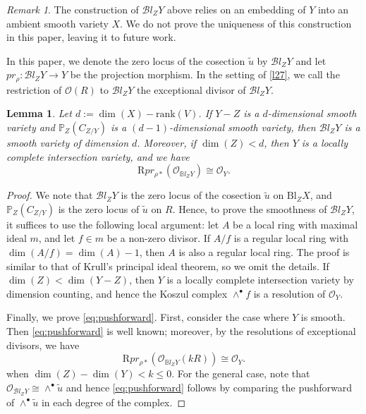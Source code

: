 \documentclass{amsart}
\numberwithin{equation}{section}
\newcommand\mc{\mathcal}
\newcommand\mb{\mathbb}
\newcommand{\rank}{\mathrm{rank}}
\newcommand{\Bl}{\mathrm{Bl}}
\newtheorem{lemma}[theorem]{Lemma}
\theoremstyle{definition}
\theoremstyle{remark}
\newtheorem{remark}[theorem]{Remark}
\begin{document}
\begin{remark}
  The construction of $\mc{B}l_ZY$ above relies on an embedding of $Y$ into an ambient smooth variety $X$. We do not prove the uniqueness of this construction in this paper, leaving it to future work. 
\end{remark}
In this paper, we denote the zero locus of the cosection $\tilde{u}$ by $\mc{B}l_ZY$ and let $pr_\rho:\mc{B}l_ZY\to Y$ be the projection morphism. In the setting of \cref{l27}, we call the restriction of $\mc{O}(R)$ to $\mc{B}l_ZY$ the exceptional divisor of $\mc{B}l_ZY$. 
\begin{lemma}
  \label{l28}
  Let $d:=\dim(X)-\rank(V)$. 
  If $Y-Z$ is a $d$-dimensional smooth variety and $\mb{P}_Z(C_{Z/Y})$ is a $(d-1)$-dimensional smooth variety, then $\mc{B}l_ZY$ is a smooth variety of dimension $d$. Moreover, if $\dim(Z)<d$, then $Y$ is a locally complete intersection variety, and we have 
  \begin{equation}
    \label{eq:pushforward}
    \mathrm{R}pr_{\rho*}(\mathcal{O}_{\mb{B}l_ZY})\cong \mathcal{O}_Y.
  \end{equation}
\end{lemma}
\begin{proof}
  We note that $\mc{B}l_ZY$ is the zero locus of the cosection $\tilde{u}$ on $\Bl_ZX$, and $\mb{P}_Z(C_{Z/Y})$ is the zero locus of $\tilde{u}$ on $R$. Hence, to prove the smoothness of $\mc{B}l_ZY$, it suffices to use the following local argument: let $A$ be a local ring with maximal ideal $m$, and let $f\in m$ be a non-zero divisor. If $A/f$ is a regular local ring with $\dim(A/f)=\dim(A)-1$, then $A$ is also a regular local ring. The proof is similar to that of Krull's principal ideal theorem, so we omit the details. If $\dim(Z)< \dim(Y-Z)$, then $Y$ is a locally complete intersection variety by dimension counting, and hence the Koszul complex $\wedge^{\bullet}f$ is a resolution of $\mathcal{O}_Y$. 

  Finally, we prove \cref{eq:pushforward}. First, consider the case where $Y$ is smooth. Then \cref{eq:pushforward} is well known; moreover, by the resolutions of exceptional divisors, we have 
    \begin{equation*}
    \mathrm{R}pr_{\rho*}(\mathcal{O}_{\mb{B}l_ZY}(kR))\cong \mathcal{O}_Y.
  \end{equation*}
  when $\dim(Z)-\dim(Y)< k\leq 0$. For the general case, note that $\mc{O}_{\mc{B}l_ZY}\cong \wedge^{\bullet}\tilde{u}$ and hence \cref{eq:pushforward} follows by comparing the pushforward of $\wedge^{\bullet}\tilde{u}$ in each degree of the complex.
\end{proof}
\end{document}
